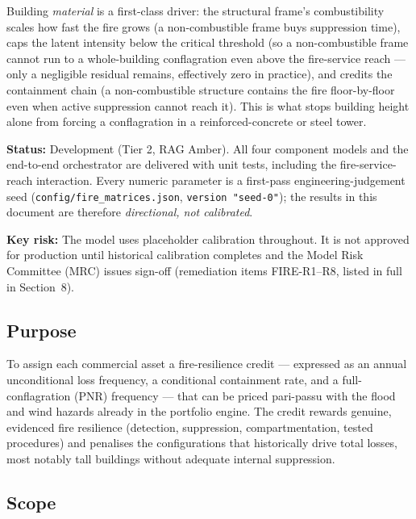 \documentclass[11pt,a4paper]{article}
\begin{document}
Building \emph{material} is a first-class driver: the structural frame's
combustibility scales how fast the fire grows (a non-combustible frame buys
suppression time), caps the latent intensity below the critical threshold (so a
non-combustible frame cannot run to a whole-building conflagration even above the
fire-service reach --- only a negligible residual remains, effectively zero in
practice), and credits the
containment chain (a non-combustible structure contains the fire floor-by-floor
even when active suppression cannot reach it). This is what stops building height
alone from forcing a conflagration in a reinforced-concrete or steel tower.

\textbf{Status:} Development (Tier 2, RAG Amber). All four component models and
the end-to-end orchestrator are delivered with unit tests, including the
fire-service-reach interaction. Every numeric parameter is a first-pass
engineering-judgement seed (\texttt{config/fire\_matrices.json},
\texttt{version "seed-0"}); the results in this document are therefore
\emph{directional, not calibrated}.

\textbf{Key risk:} The model uses placeholder calibration throughout. It is not
approved for production until historical calibration completes and the Model
Risk Committee (MRC) issues sign-off (remediation items FIRE-R1--R8, listed in
full in Section~8).

\mkmpurpose

\subsection{Purpose}

To assign each commercial asset a fire-resilience credit --- expressed as an
annual unconditional loss frequency, a conditional containment rate, and a
full-conflagration (PNR) frequency --- that can be priced pari-passu with the
flood and wind hazards already in the portfolio engine. The credit rewards
genuine, evidenced fire resilience (detection, suppression, compartmentation,
tested procedures) and penalises the configurations that historically drive
total losses, most notably tall buildings without adequate internal
suppression.

\subsection{Scope}
\end{document}
